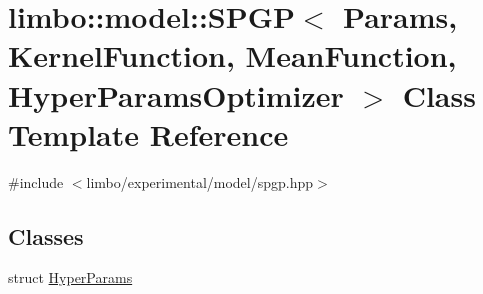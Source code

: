 \hypertarget{classlimbo_1_1model_1_1_s_p_g_p}{}\section{limbo\+:\+:model\+:\+:S\+P\+GP$<$ Params, Kernel\+Function, Mean\+Function, Hyper\+Params\+Optimizer $>$ Class Template Reference}
\label{classlimbo_1_1model_1_1_s_p_g_p}


{\ttfamily \#include $<$limbo/experimental/model/spgp.\+hpp$>$}

\subsection*{Classes}
\begin{DoxyCompactItemize}
\item 
struct \hyperlink{structlimbo_1_1model_1_1_s_p_g_p_1_1_hyper_params}{Hyper\+Params}
\end{DoxyCompactItemize}
